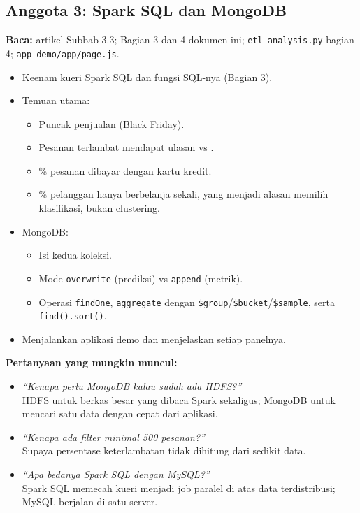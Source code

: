 \documentclass[11pt,a4paper]{article}
\newcommand{\f}[1]{\texttt{#1}}
\newcommand{\tanya}[2]{\item \textit{``#1''}\\ #2}
\begin{document}
\subsection{Anggota 3: Spark SQL dan MongoDB}
\textbf{Baca:} artikel Subbab 3.3; Bagian 3 dan 4 dokumen ini; \f{etl\_analysis.py}
bagian 4; \f{app-demo/app/page.js}.
\begin{itemize}
\item Keenam kueri Spark SQL dan fungsi SQL-nya (Bagian 3).
\item Temuan utama:
  \begin{itemize}
  \item Puncak penjualan \peakMonth{} (Black Friday).
  \item Pesanan terlambat mendapat ulasan \lateReview{} vs \onTimeReview.
  \item \cardShare\% pesanan dibayar dengan kartu kredit.
  \item \oneTimePct\% pelanggan hanya berbelanja sekali, yang menjadi alasan memilih
    klasifikasi, bukan clustering.
  \end{itemize}
\item MongoDB:
  \begin{itemize}
  \item Isi kedua koleksi.
  \item Mode \f{overwrite} (prediksi) vs \f{append} (metrik).
  \item Operasi \f{findOne}, \f{aggregate} dengan \f{\$group}/\f{\$bucket}/\f{\$sample},
    serta \f{find().sort()}.
  \end{itemize}
\item Menjalankan aplikasi demo dan menjelaskan setiap panelnya.
\end{itemize}
\textbf{Pertanyaan yang mungkin muncul:}
\begin{itemize}
\tanya{Kenapa perlu MongoDB kalau sudah ada HDFS?}{HDFS untuk berkas besar yang dibaca Spark
  sekaligus; MongoDB untuk mencari satu data dengan cepat dari aplikasi.}
\tanya{Kenapa ada filter minimal 500 pesanan?}{Supaya persentase keterlambatan tidak
  dihitung dari sedikit data.}
\tanya{Apa bedanya Spark SQL dengan MySQL?}{Spark SQL memecah kueri menjadi job paralel di
  atas data terdistribusi; MySQL berjalan di satu server.}
\end{itemize}
\end{document}
